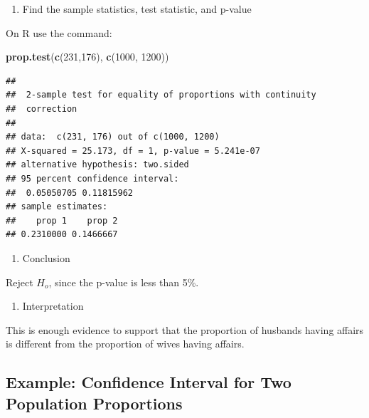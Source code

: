 \documentclass[]{book}
\newenvironment{Shaded}{\begin{snugshade}}{\end{snugshade}}
\newcommand{\DecValTok}[1]{\textcolor[rgb]{0.00,0.00,0.81}{#1}}
\newcommand{\KeywordTok}[1]{\textcolor[rgb]{0.13,0.29,0.53}{\textbf{#1}}}
\newcommand{\NormalTok}[1]{#1}
\providecommand{\tightlist}{%
  \setlength{\itemsep}{0pt}\setlength{\parskip}{0pt}}
\begin{document}
\begin{enumerate}
\def\labelenumi{\arabic{enumi}.}
\setcounter{enumi}{3}
\tightlist
\item
  Find the sample statistics, test statistic, and p-value
\end{enumerate}

On R use the command:

\begin{Shaded}
\begin{Highlighting}[]
\KeywordTok{prop.test}\NormalTok{(}\KeywordTok{c}\NormalTok{(}\DecValTok{231}\NormalTok{,}\DecValTok{176}\NormalTok{), }\KeywordTok{c}\NormalTok{(}\DecValTok{1000}\NormalTok{, }\DecValTok{1200}\NormalTok{))}
\end{Highlighting}
\end{Shaded}

\begin{verbatim}
## 
##  2-sample test for equality of proportions with continuity
##  correction
## 
## data:  c(231, 176) out of c(1000, 1200)
## X-squared = 25.173, df = 1, p-value = 5.241e-07
## alternative hypothesis: two.sided
## 95 percent confidence interval:
##  0.05050705 0.11815962
## sample estimates:
##    prop 1    prop 2 
## 0.2310000 0.1466667
\end{verbatim}

\begin{enumerate}
\def\labelenumi{\arabic{enumi}.}
\setcounter{enumi}{4}
\tightlist
\item
  Conclusion
\end{enumerate}

Reject \(H_o\), since the p-value is less than 5\%.

\begin{enumerate}
\def\labelenumi{\arabic{enumi}.}
\setcounter{enumi}{5}
\tightlist
\item
  Interpretation
\end{enumerate}

This is enough evidence to support that the proportion of husbands having affairs is different from the proportion of wives having affairs.

\hypertarget{example-confidence-interval-for-two-population-proportions}{%
\subsection{Example: Confidence Interval for Two Population Proportions}\label{example-confidence-interval-for-two-population-proportions}}
\end{document}
